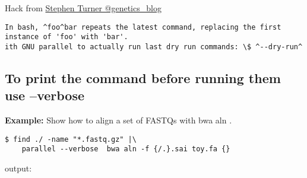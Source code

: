 \documentclass{article}
\newcommand{\example}[1]{
\textbf{Example: } {\color[rgb]{0,0,1} #1 } .
}
\begin{document}
Hack from \href{https://twitter.com/genetics\_blog/status/389765670336212992}{Stephen Turner @genetics\_blog}
\begin{verbatim}
In bash, ^foo^bar repeats the latest command, replacing the first instance of 'foo' with 'bar'.
ith GNU parallel to actually run last dry run commands: \$ ^--dry-run^
\end{verbatim}


\subsection{To print the command before running them use --verbose}
\example{Show how to align a set of FASTQs with bwa aln }
\begin{lstlisting}
$ find ./ -name "*.fastq.gz" |\
	parallel --verbose  bwa aln -f {/.}.sai toy.fa {}
\end{lstlisting}
output:
\end{document}
